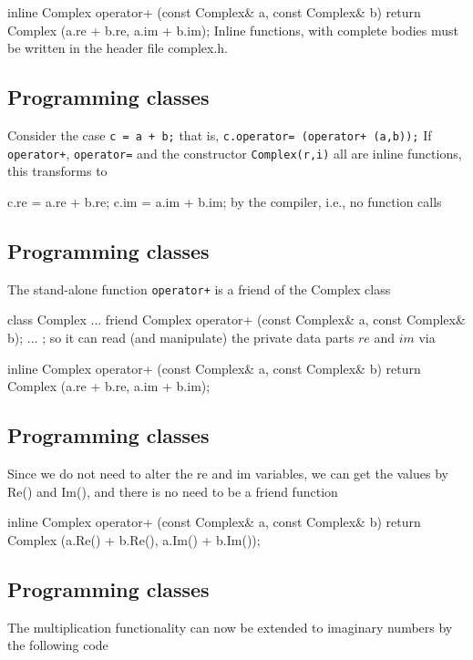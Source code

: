 \documentclass[%
oneside,                 %
final,                   %
10pt]{article}
\begin{document}
{{{{{{{{{{{{{{\bcppcod
inline Complex operator+ (const Complex& a, const Complex& b)
{ return Complex (a.re + b.re, a.im + b.im); }
\ecppcod
Inline functions, with complete bodies must be written in the header file  complex.h.

\subsection{Programming classes}

Consider  the case \Verb!c = a + b;!
that is,  \Verb!c.operator= (operator+ (a,b));!
If \Verb!operator+!, \Verb!operator=! and the constructor \Verb!Complex(r,i)! all
are inline functions, this transforms to

\bcppcod
c.re = a.re + b.re;
c.im = a.im + b.im;
\ecppcod
by the compiler, i.e., no function calls

\subsection{Programming classes}

The stand-alone function \Verb!operator+! is a friend of the Complex  class

\bcppcod
class Complex
{
   ...
   friend Complex operator+ (const Complex& a, const Complex& b);
   ...
};
\ecppcod
so it can read (and manipulate) the private data parts $re$ and
$im$ via

\bcppcod
inline Complex operator+ (const Complex& a, const Complex& b)
{ return Complex (a.re + b.re, a.im + b.im); }
\ecppcod

\subsection{Programming classes}

Since we do not need to alter the re and im variables, we can
get the values by Re() and Im(), and there is no need to be a
friend function

\bcppcod
inline Complex operator+ (const Complex& a, const Complex& b)
{ return Complex (a.Re() + b.Re(), a.Im() + b.Im()); }
\ecppcod

\subsection{Programming classes}

The multiplication functionality can now be extended to imaginary numbers by the following code

}}}}}}}}}}}}}}
\end{document}
